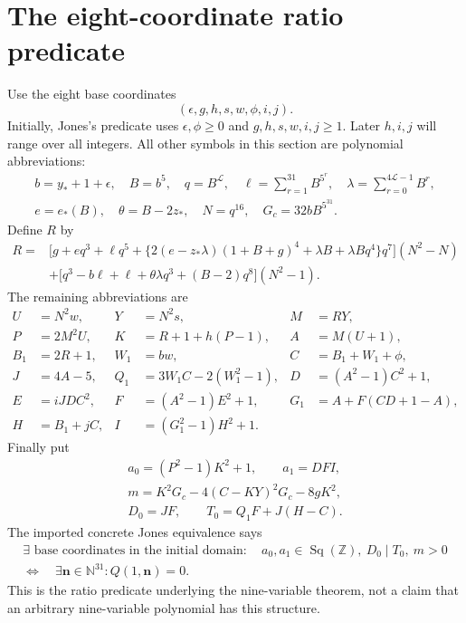 \documentclass[11pt]{article}
\theoremstyle{remark}\newtheorem{remark}[theorem]{Remark}
\newcommand{\Z}{\mathbb Z}\newcommand{\N}{\mathbb N}
\newcommand{\Sq}{\operatorname{Sq}(\Z)}
\begin{document}
\section{The eight-coordinate ratio predicate}\label{sec:ratio}
Use the eight base coordinates
\[
 (\epsilon,g,h,s,w,\phi,i,j).
\]
Initially, Jones's predicate uses $\epsilon,\phi\ge0$ and
$g,h,s,w,i,j\ge1$. Later $h,i,j$ will range over all integers.
All other symbols in this section are polynomial abbreviations:
\begin{gather*}
 b=y_*+1+\epsilon,\quad B=b^5,\quad q=B^{\mathcal L},\quad
 \ell=\sum_{r=1}^{31}B^{5^r},\quad
 \lambda=\sum_{r=0}^{4\mathcal L-1}B^r,\\
 e=e_*(B),\quad \theta=B-2z_*,\quad N=q^{16},\quad
 G_c=32bB^{5^{31}}.
\end{gather*}
Define $R$ by
\begin{align*}
 R={}&\bigl[g+eq^3+\ell q^5+
  \{2(e-z_*\lambda)(1+B+g)^4+\lambda B+\lambda Bq^4\}q^7\bigr](N^2-N)\\
 &+\bigl[q^3-b\ell+\ell+\theta\lambda q^3+(B-2)q^8\bigr](N^2-1).
\end{align*}
The remaining abbreviations are
\begin{align*}
 U&=N^2w,&Y&=N^2s,&M&=RY,\\
 P&=2M^2U,&K&=R+1+h(P-1),&A&=M(U+1),\\
 B_1&=2R+1,&W_1&=bw,&C&=B_1+W_1+\phi,\\
 J&=4A-5,&Q_1&=3W_1C-2(W_1^2-1),&D&=(A^2-1)C^2+1,\\
 E&=iJDC^2,&F&=(A^2-1)E^2+1,&G_1&=A+F(CD+1-A),\\
 H&=B_1+jC,&I&=(G_1^2-1)H^2+1.&&
\end{align*}
Finally put
\begin{gather*}
 a_0=(P^2-1)K^2+1,\qquad a_1=DFI,\\
 m=K^2G_c-4(C-KY)^2G_c-8gK^2,\\
 D_0=JF,\qquad T_0=Q_1F+J(H-C).
\end{gather*}
The imported concrete Jones equivalence says
\begin{equation}
 \begin{gathered}
 \exists\text{ base coordinates in the initial domain}:\quad
 a_0,a_1\in\Sq,\ D_0\mid T_0,\ m>0\\
 \Longleftrightarrow\quad \exists\mathbf n\in\N^{31}:Q(1,\mathbf n)=0.
 \end{gathered}
 \tag{JR}\label{eq:JR}
\end{equation}
This is the ratio predicate underlying the nine-variable theorem, not a
claim that an arbitrary nine-variable polynomial has this structure.
\end{document}
